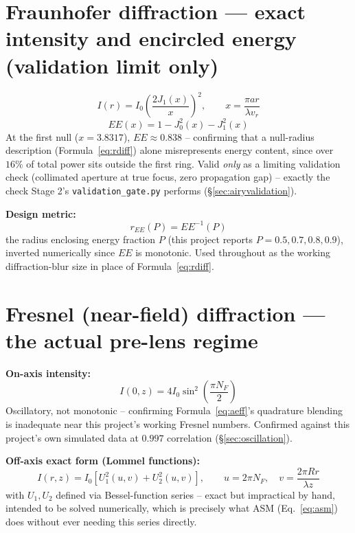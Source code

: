 \documentclass[11pt]{report}
\newcommand{\vr}{v_r}
\begin{document}
\section{Fraunhofer diffraction --- exact intensity and encircled energy (validation limit only)}

\begin{equation}
I(r) = I_0\left(\frac{2J_1(x)}{x}\right)^2, \qquad x = \frac{\pi a r}{\lambda \vr}
\label{eq:airy}
\end{equation}
\begin{equation}
EE(x) = 1 - J_0^2(x) - J_1^2(x)
\label{eq:encircledenergy}
\end{equation}
At the first null ($x = 3.8317$), $EE \approx 0.838$ -- confirming that a null-radius description (Formula~\ref{eq:rdiff}) alone misrepresents energy content, since over $16\%$ of total power sits outside the first ring. Valid \emph{only} as a limiting validation check (collimated aperture at true focus, zero propagation gap) -- exactly the check Stage 2's \texttt{validation\_gate.py} performs (\S\ref{sec:airyvalidation}).

\textbf{Design metric:}
\begin{equation}
r_{EE}(P) = EE^{-1}(P)
\label{eq:reeP}
\end{equation}
the radius enclosing energy fraction $P$ (this project reports $P=0.5,0.7,0.8,0.9$), inverted numerically since $EE$ is monotonic. Used throughout as the working diffraction-blur size in place of Formula~\ref{eq:rdiff}.

\section{Fresnel (near-field) diffraction --- the actual pre-lens regime}

\textbf{On-axis intensity:}
\begin{equation}
I(0,z) = 4I_0\sin^2\!\left(\frac{\pi N_F}{2}\right)
\label{eq:onaxis}
\end{equation}
Oscillatory, not monotonic -- confirming Formula~\ref{eq:aeff}'s quadrature blending is inadequate near this project's working Fresnel numbers. Confirmed against this project's own simulated data at $0.997$ correlation (\S\ref{sec:oscillation}).

\textbf{Off-axis exact form (Lommel functions):}
\begin{equation}
I(r,z) = I_0\left[U_1^2(u,v) + U_2^2(u,v)\right], \qquad u = 2\pi N_F,\quad v = \frac{2\pi R r}{\lambda z}
\label{eq:lommel}
\end{equation}
with $U_1, U_2$ defined via Bessel-function series -- exact but impractical by hand, intended to be solved numerically, which is precisely what ASM (Eq.~\ref{eq:asm}) does without ever needing this series directly.
\end{document}
